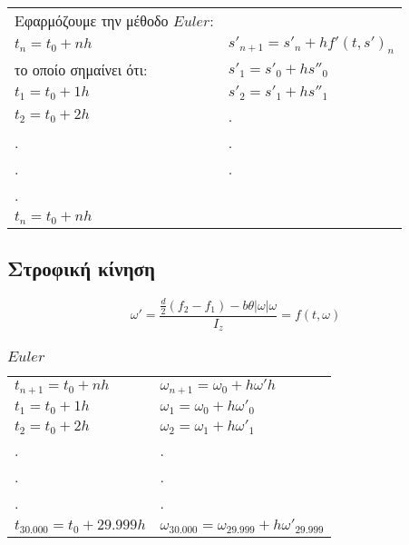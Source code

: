 \documentclass[a4paper]{article}
\begin{document}
        
            \begin{tabular}{ll}
                Εφαρμόζουμε την μέθοδο $Euler$:                             &                               \\
                $t_n=t_0+nh$                                                & $s'_{n+1}=s'_n+hf'(t,s')_n$   \\
                το οποίο σημαίνει ότι:                                      & $s'_1=s'_0+hs''_0$            \\
                $t_1=t_0+1h$                                                & $s'_2=s'_1+hs''_1$            \\
                $t_2=t_0+2h$                                                & .                             \\
                .                                                           & .                             \\
                .                                                           & .                             \\
                .                                                           &                               \\
                $t_n=t_0+nh$                                                &                         
            \end{tabular}


            \subsection*{Στροφική κίνηση}
            
            \begin{equation}
                \omega'=\frac{\frac{d}{2}(f_2-f_1)-b\theta\rvert\omega\lvert\omega}{I_z}=f(t,\omega)
            \end{equation}
            \subsubsection*{$Euler$}
            \begin{tabular}{ll}
                $t_{n+1}=t_0+nh$ & $\omega_{n+1} = \omega_0+h\omega'h$\\
                $t_1 = t_0+1h$&$\omega_1 = \omega_0+h\omega'_0$\\
                $t_2=t_0+2h$ & $\omega_2=\omega_1+h\omega'_1$\\
                .&.\\
                .&.\\
                .&.\\
                $t_{30.000}=t_0+29.999h$&$\omega_{30.000}=\omega_{29.999}+h\omega'_{29.999}$\\
            \end{tabular}
\end{document}
